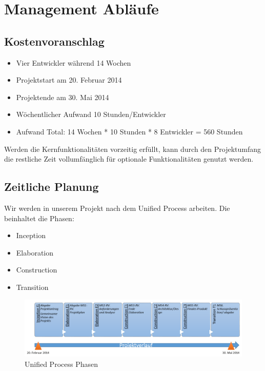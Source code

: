 \chapter{Management Abläufe}

\section{Kostenvoranschlag}
\begin{itemize}
    \item Vier Entwickler während 14 Wochen
    \item Projektstart am 20. Februar 2014
    \item Projektende am 30. Mai 2014
    \item Wöchentlicher Aufwand 10 Stunden/Entwickler
    \item Aufwand Total: 14 Wochen * 10 Stunden * 8 Entwickler = 560 Stunden
\end{itemize}
Werden die Kernfunktionalitäten vorzeitig erfüllt, kann durch den Projektumfang die restliche Zeit vollumfänglich für optionale Funktionalitäten genutzt werden.

\section{Zeitliche Planung}
Wir werden in unserem Projekt nach dem Unified Process arbeiten. Die beinhaltet die Phasen: 
\\\begin{itemize}
    \item Inception
    \item Elaboration
    \item Construction
    \item Transition
\end{itemize}
\begin{figure}[ht]
    \center
    \includegraphics[width=\textwidth]{content/images/projektverlauf.png}
    \caption{Unified Process Phasen}
\end{figure}

